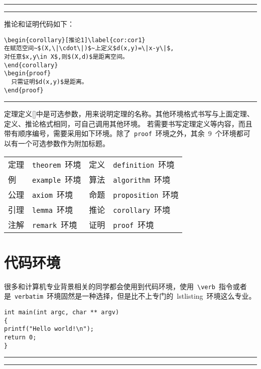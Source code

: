 \noindent\hrule\vspace{0.1em}

\noindent\hrule
\vspace{1em}
推论和证明代码如下：
\begin{verbatim}
\begin{corollary}[推论1]\label{cor:cor1}
在赋范空间~$(X,\|\cdot\|)$~上定义$d(x,y)=\|x-y\|$,
对任意$x,y\in X$,则$(X,d)$是距离空间。
\end{corollary}
\begin{proof}
  只需证明$d(x,y)$是距离。
\end{proof}
\end{verbatim}
\noindent\hrule\vspace{1em}

定理定义[]中是可选参数，用来说明定理的名称。其他环境格式书写与上面定理、定义、推论格式相同，可自己调用其他环境。
若需要书写定理定义等内容，而且带有顺序编号，需要采用如下环境。除了~\verb|proof|~环境之外，其余~9~个环境都可以有一个可选参数作为附加标题。

\begin{center}
\vspace{0.5em}\noindent\wuhao\begin{tabularx}{0.7\textwidth}{lX|lX}
定理 & \verb|theorem|~环境 & 定义 & \verb|definition|~环境 \\
例 & \verb|example|~环境 & 算法 & \verb|algorithm|~环境 \\
公理 & \verb|axiom|~环境 & 命题 & \verb|proposition|~环境 \\
引理 & \verb|lemma|~环境 & 推论 & \verb|corollary|~环境 \\
注解 & \verb|remark|~环境 & 证明 & \verb|proof|~环境 \\
\end{tabularx}
\end{center}
\section{代码环境}
很多和计算机专业背景相关的同学都会使用到代码环境，使用~\verb|\verb|~指令或者是~\verb|verbatim|~环境固然是一种选择，但是比不上专门的~lstlisting~环境这么专业。
\begin{lstlisting}
int main(int argc, char ** argv)
{
printf("Hello world!\n");
return 0;
}
\end{lstlisting}

\noindent\hrule
\vspace{0.1em}\noindent\hrule

\vspace{1em}

